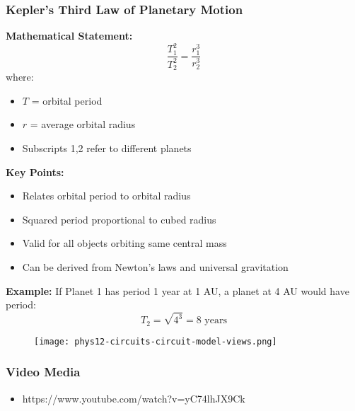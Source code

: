 \documentclass{beamer}
\begin{document}
\begin{frame}
\frametitle{Kepler's Third Law of Planetary Motion}

\textbf{Mathematical Statement:}
\[ \frac{T_1^2}{T_2^2} = \frac{r_1^3}{r_2^3} \]
where:
\begin{itemize}
    \item $T$ = orbital period
    \item $r$ = average orbital radius
    \item Subscripts 1,2 refer to different planets
\end{itemize}

\textbf{Key Points:}
\begin{itemize}
    \item Relates orbital period to orbital radius
    \item Squared period proportional to cubed radius
    \item Valid for all objects orbiting same central mass
    \item Can be derived from Newton's laws and universal gravitation
\end{itemize}

\textbf{Example:}
If Planet 1 has period 1 year at 1 AU, a planet at 4 AU would have period:
\[ T_2 = \sqrt{4^3} = 8 \text{ years} \]
\end{frame}


\begin{frame}
\begin{figure}
    \centering
    \texttt{[image: phys12-circuits-circuit-model-views.png]}
\end{figure}
\end{frame}


\begin{frame}
\frametitle{Video Media}
\begin{itemize}
  \item https://www.youtube.com/watch?v=yC74lhJX9Ck
\end{itemize}
\end{frame}
\end{document}
